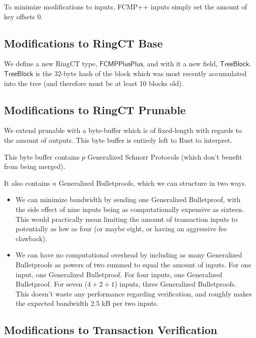 \documentclass[]{article}
\begin{document}
To minimize modifications to inputs, FCMP++ inputs simply set the amount of key offsets 0.

\subsection{Modifications to RingCT Base}

We define a new RingCT type, $\mathsf{FCMPPlusPlus}$, and with it a new field, $\mathsf{TreeBlock}$. $\mathsf{TreeBlock}$ is the 32-byte hash of the block which was most recently accumulated into the tree (and therefore must be at least 10 blocks old).

\subsection{Modifications to RingCT Prunable}

We extend prunable with a byte-buffer which is of fixed-length with regards to the amount of outputs. This byte buffer is entirely left to Rust to interpret.

This byte buffer contains $p$ Generalized Schnorr Protocols (which don't benefit from being merged).

It also contains $n$ Generalized Bulletproofs, which we can structure in two ways.

\begin{itemize}
	\item We can minimize bandwidth by sending one Generalized Bulletproof, with the side effect of nine inputs being as computationally expensive as sixteen. This would practically mean limiting the amount of transaction inputs to potentially as low as four (or maybe eight, or having an aggressive fee clawback).
	\item We can have no computational overhead by including as many Generalized Bulletproofs as powers of two summed to equal the amount of inputs. For one input, one Generalized Bulletproof. For four inputs, one Generalized Bulletproof. For seven ($4 + 2 + 1$) inputs, three Generalized Bulletproofs. This doesn't waste any performance regarding verification, and roughly makes the expected bandwidth 2.5 kB per two inputs.
\end{itemize}

\subsection{Modifications to Transaction Verification}
\end{document}
